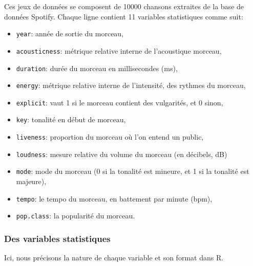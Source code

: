 \documentclass[
  11pt,
  xcolor = usenames,dvipsnames]{article}
\newcommand{\passthrough}[1]{#1}
\providecommand{\tightlist}{%
  \setlength{\itemsep}{0pt}\setlength{\parskip}{0pt}}
\begin{document}
Ces jeux de données se composent de 10000 chansons extraites de la base de données Spotify.
Chaque ligne contient 11 variables statistiques comme suit:

\begin{itemize}
\tightlist
\item
  \passthrough{\lstinline!year!}: année de sortie du morceau,
\item
  \passthrough{\lstinline!acousticness!}: métrique relative interne de l'acoustique morceau,
\item
  \passthrough{\lstinline!duration!}: durée du morceau en millisecondes (ms),
\item
  \passthrough{\lstinline!energy!}: métrique relative interne de l'intensité, des rythmes du morceau,
\item
  \passthrough{\lstinline!explicit!}: vaut 1 si le morceau contient des vulgarités, et 0 sinon,
\item
  \passthrough{\lstinline!key!}: tonalité en début de morceau,
\item
  \passthrough{\lstinline!liveness!}: proportion du morceau où l'on entend un public,
\item
  \passthrough{\lstinline!loudness!}: mesure relative du volume du morceau (en décibels, dB)
\item
  \passthrough{\lstinline!mode!}: mode du morceau (0 si la tonalité est mineure, et 1 si la tonalité est majeure),
\item
  \passthrough{\lstinline!tempo!}: le tempo du morceau, en battement par minute (bpm),
\item
  \passthrough{\lstinline!pop.class!}: la popularité du morceau.
\end{itemize}

\hypertarget{des-variables-statistiques}{%
\subsubsection{Des variables statistiques}\label{des-variables-statistiques}}

Ici, nous précisons la nature de chaque variable et son format dans R.
\end{document}
